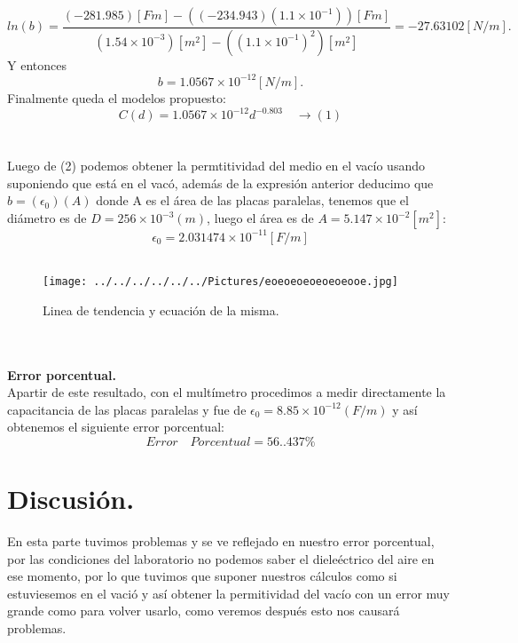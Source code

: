 \documentclass[11pt,a4paper]{article}
\begin{document}
\[ ln(b)=\frac { \left( -281.985\right) \left[ Fm \right] -\left( (-234.943)(1.1\times {10}^{ -1 }) \right) \left[ Fm \right]  }{ (1.54\times {10}^{ -3 })\left[ m^{ 2 } \right] -((1.1\times{10}^{ -1 })^{2})\left[ m^{ 2 } \right]  } =-27.63102 \left[ { N }/m \right] .\]
Y entonces 
\[ b=1.0567\times { 10 }^{ -12 } \left[ { N }/m \right].\]
Finalmente queda el modelos propuesto:
\[ C(d)=1.0567\times { 10 }^{ -12 }d^{ -0.803 }  \quad \rightarrow(1) \]
\medskip
\\
\\
 Luego de (2) podemos obtener la permtitividad del medio en el vac\'{i}o usando suponiendo que est\'{a} en el vac\'{o}, adem\'{a}s de la expresi\'{o}n anterior deducimo que $b= ({\epsilon}_{0})(A)$ donde A es el \'{a}rea de las placas paralelas, tenemos que el di\'{a}metro es de $D= 256 \times {10}^{ -3 } (m)$, luego el \'{a}rea es de $A=5.147 \times {10}^{-2} \left[ { m }^{ 2 } \right]$: 
\[{\epsilon}_{0} = 2.031474\times {10}^{ -11 } \left[ { F/m } \right] \]
\\
\begin{figure}[hbtp]
\centering
\texttt{[image: ../../../../../../Pictures/eoeoeoeoeoeoeooe.jpg]} 
\caption{Linea de tendencia y ecuaci\'{o}n de la misma. }
\end{figure}
\\
\\
\textbf{Error porcentual.}\\
Apartir de este resultado, con el mult\'{i}metro procedimos a medir directamente la capacitancia de las placas paralelas y fue de ${\epsilon}_{0} = 8.85\times {10}^{-12} (F/m) $ y as\'{i} obtenemos el siguiente error porcentual: 
\[Error \quad Porcentual = 56..437 \% \]

\section*{Discusi\'{o}n.}
En esta parte tuvimos problemas y se ve reflejado en nuestro error porcentual, por las condiciones del laboratorio no podemos saber el diele\'{e}ctrico del aire en ese momento, por lo que tuvimos que suponer nuestros c\'{a}lculos como si estuviesemos en el vaci\'{o} y as\'{i} obtener la permitividad del vac\'{i}o con un error muy grande como para volver usarlo, como veremos despu\'{e}s esto nos causar\'{a} problemas. 

\pagebreak
\end{document}
